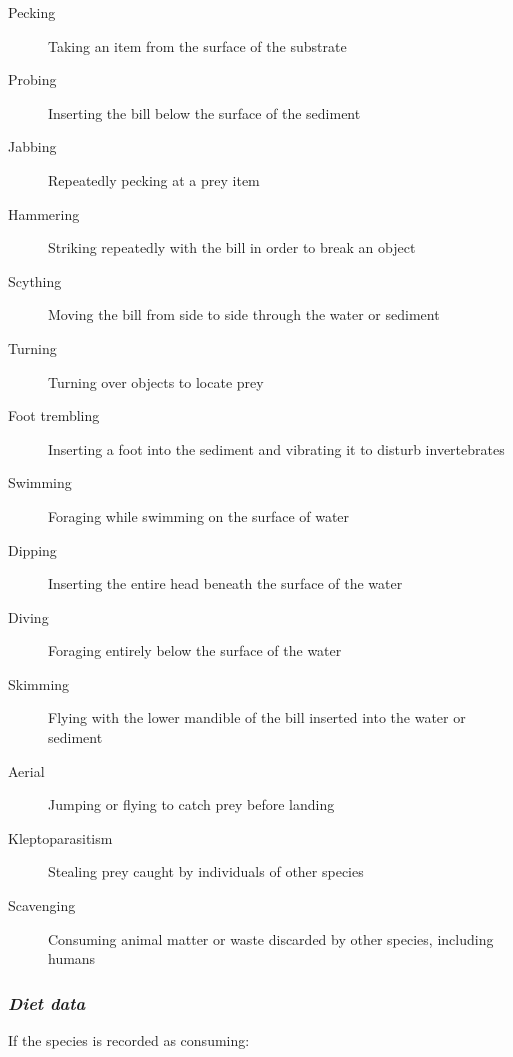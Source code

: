 \documentclass[12pt,a4paper,draft]{book}
\begin{document}
\begin{description}
\item[Pecking] Taking an item from the surface of the substrate
\item[Probing] Inserting the bill below the surface of the sediment
\item[Jabbing] Repeatedly pecking at a prey item
\item[Hammering] Striking repeatedly with the bill in order to break an object
\item[Scything] Moving the bill from side to side through the water or sediment
\item[Turning] Turning over objects to locate prey
\item[Foot trembling] Inserting a foot into the sediment and vibrating it to disturb invertebrates
\item[Swimming] Foraging while swimming on the surface of water
\item[Dipping] Inserting the entire head beneath the surface of the water
\item[Diving] Foraging entirely below the surface of the water
\item[Skimming] Flying with the lower mandible of the bill inserted into the water or sediment
\item[Aerial] Jumping or flying to catch prey before landing
\item[Kleptoparasitism] Stealing prey caught by individuals of other species
\item[Scavenging] Consuming animal matter or waste discarded by other species, including humans
\end{description}
\medskip
\subsubsection{\textit{Diet data}} If the species is recorded as consuming:
\end{document}
